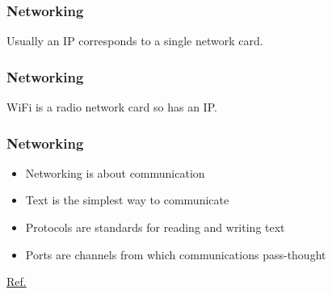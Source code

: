 \begin{frame}
\frametitle{Networking}
Usually an IP corresponds to a single network card.
\end{frame}

\begin{frame}
\frametitle{Networking}
WiFi is a radio network card so has an IP.
\end{frame}




\begin{frame}
\frametitle{Networking}
\begin{itemize}
\item Networking is about communication
\item Text is the simplest way to communicate
\item Protocols are standards for reading and writing text
\item Ports are channels from which communications pass-thought
\end{itemize}
\tiny
\href{https://betterexplained.com/articles/a-simple-introduction-to-computer-networking/}{Ref.}
\normalsize
\end{frame}

